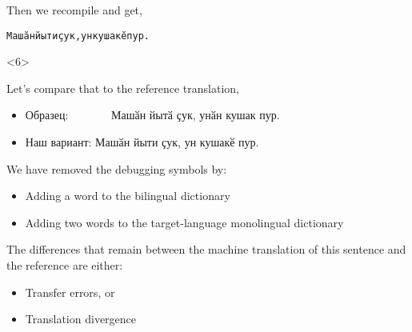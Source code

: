 \documentclass[10pt,xetex]{beamer} %
\begin{document}
\begin{frame}[fragile]
\begin{onlyenv}
\begin{verbatim}
\end{verbatim}

Then we recompile and get,

\begin{alltt}
{\smallermono Машӑн йыти ҫук, ун кушакӗ пур. }
\end{alltt}

\end{onlyenv}

\begin{onlyenv}<6>

Let's compare that to the reference translation,

\begin{itemize}
  \item Образец: ~~~~~~~Машӑн йытӑ ҫук, унӑн кушак пур.
  \item Наш вариант: Машӑн \alert{йыти} ҫук, \alert{ун} \alert{кушакӗ} пур.
\end{itemize}

We have removed the debugging symbols by:

\begin{itemize}

  \item Adding a word to the bilingual dictionary
  \item Adding two words to the target-language monolingual dictionary
\end{itemize}

The differences that remain between the machine translation of this sentence 
and the reference are either:

\begin{itemize}

  \item Transfer errors, or
  \item Translation divergence 
\end{itemize}

\end{onlyenv}

\end{frame}
\end{document}
